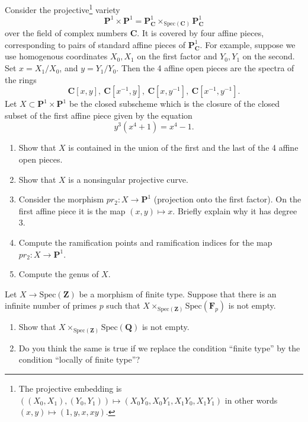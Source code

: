\begin{exercise}
\label{exercise-curve-p1-p1}
Consider the
projective\footnote{The projective embedding is
$((X_0, X_1), (Y_0, Y_1))\mapsto (X_0Y_0, X_0Y_1, X_1Y_0, X_1Y_1)$
in other words $(x, y)\mapsto (1, y, x, xy)$.} variety
$$
{\mathbf P}^1 \times {\mathbf P}^1 = {\mathbf P}^1_{{\mathbf C}}
\times_{\text{Spec}({\mathbf C})} {\mathbf P}^1_{\mathbf C}
$$
over the field of complex numbers ${\mathbf C}$. It is covered by four affine
pieces,
corresponding to pairs of standard affine pieces of ${\mathbf P}^1_{\mathbf
C}$. For example,
suppose we use homogenous coordinates $X_0, X_1$ on the first factor and
$Y_0, Y_1$ on the second. Set $x = X_1/X_0$, and $y = Y_1/Y_0$. Then the 4
affine open pieces are the spectra of the  rings
$$
{\mathbf C}[x, y], \ 
{\mathbf C}[x^{-1}, y], \ 
{\mathbf C}[x, y^{-1}], \ 
{\mathbf C}[x^{-1}, y^{-1}].
$$
Let $X \subset {\mathbf P}^1 \times {\mathbf P}^1$ be the closed subscheme
which is the
closure of the closed subset of the first affine piece given by the equation
$$
y^3(x^4 + 1) = x^4 -1.
$$
\begin{enumerate}
\item Show that $X$ is contained in the union of the first and
the last of the 4 affine open pieces.
\item Show that $X$ is a nonsingular projective curve.
\item Consider the morphism $pr_2 : X \to {\mathbf P}^1$ (projection onto
the first factor). On the first affine piece it is the map $(x, y) \mapsto x$.
Briefly explain why it has degree $3$.
\item Compute the ramification points and ramification indices
for the map $pr_2 : X \to {\mathbf P}^1$.
\item Compute the genus of $X$.
\end{enumerate}
\end{exercise}

\begin{exercise}
\label{exercise-finite-type-over-Z}
Let $X \to \text{Spec}({\mathbf Z})$ be a morphism of finite type.
Suppose that there is an infinite number of primes $p$ such that
$X\times_{\text{Spec}({\mathbf Z})} \text{Spec}({\mathbf F}_p)$ is not empty.
\begin{enumerate}
\item Show that $X \times_{\text{Spec}({\mathbf Z})}\text{Spec}(\mathbf{Q})$
is not empty.
\item Do you think the same is true if we replace the condition
``finite type'' by the condition ``locally of finite type''?
\end{enumerate}
\end{exercise}




